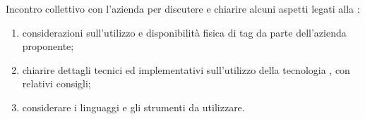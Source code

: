 Incontro collettivo con l'azienda \proponente{} per discutere e chiarire alcuni aspetti legati alla :
\begin{enumerate}
    \item considerazioni sull'utilizzo e disponibilità fisica di tag  da parte dell'azienda proponente;
    \item chiarire dettagli tecnici ed implementativi sull'utilizzo della tecnologia , con relativi consigli;
    \item considerare i linguaggi e gli strumenti da utilizzare.
\end{enumerate}